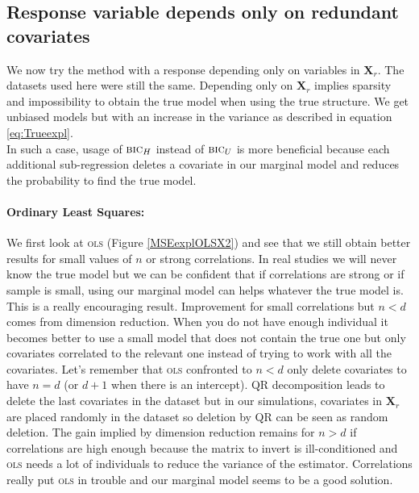 \documentclass[12pt,a4paper]{report}
\begin{document}
\clearpage
	
	\subsection{Response variable depends only on redundant covariates}	 \label{tableMSEsimgauche}
We now try the method with a response depending only on variables in $\boldsymbol{X}_{r}$. The datasets used here were still the same.
Depending only on $\boldsymbol{X}_r$ implies sparsity and impossibility to obtain the true model when using the true structure.  We get unbiased models but with an increase in the variance as described in equation \ref{eq:Trueexpl}. \\
	In such a case, usage of $\mbox{{\sc bic}}_H$ instead of $\mbox{{\sc bic}}_U$ is more beneficial because each additional sub-regression deletes a covariate in our marginal model and reduces the probability to find the true model. \\
	
	\paragraph{Ordinary Least Squares:}We first look at \textsc{ols} (Figure \ref{MSEexplOLSX2}) and see that we still obtain better results for small values of $n$ or strong correlations. In real studies we will never know the true model but we can be confident that if correlations are strong or if sample is small, using our marginal model can helps whatever the true model is. This is a really encouraging result. Improvement for small correlations but $n<d$ comes from dimension reduction. When you do not have enough individual it becomes better to use a small model that does not contain the true one but only covariates correlated to the relevant one instead of trying to work with all the covariates. Let's remember that \textsc{ols} confronted to $n<d$ only delete covariates to have $n=d$ (or $d+1$ when there is an intercept). QR decomposition leads to delete the last  covariates in the dataset but in our simulations, covariates in $\boldsymbol{X}_r$ are placed randomly in the dataset so deletion by QR can be seen as random deletion. The gain implied by dimension reduction remains for $n>d$ if correlations are high enough because the matrix to invert is ill-conditioned and \textsc{ols} needs a lot of individuals to reduce the variance of the estimator. Correlations really put \textsc{ols} in trouble and our marginal model seems to be a good solution. \\
	
\end{document}
